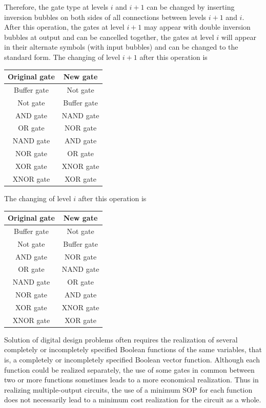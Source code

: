 \documentclass[a4paper,12pt]{report}
\begin{document}
Therefore, the gate type at levels $i$ and $i+1$ can be changed by inserting inversion bubbles on both sides of all connections between levels $i+1$ and $i$. After this operation, the gates at level $i+1$ may appear with double inversion bubbles at output and can be cancelled together, the gates at level $i$ will appear in their alternate symbols (with input bubbles) and can be changed to the standard form. The changing of level $i+1$ after this operation is
\begin{longtable}[c]{|c|c|}
\hline
Original gate & New gate \\\hline\endhead
Buffer gate & Not gate \\\hline
Not gate & Buffer gate \\\hline
AND gate & NAND gate \\\hline
OR gate & NOR gate \\\hline
NAND gate & AND gate \\\hline
NOR gate & OR gate \\\hline
XOR gate & XNOR gate \\\hline
XNOR gate & XOR gate \\\hline
\end{longtable}
The changing of level $i$ after this operation is
\begin{longtable}[c]{|c|c|}
\hline
Original gate & New gate \\\hline\endhead
Buffer gate & Not gate \\\hline
Not gate & Buffer gate \\\hline
AND gate & NOR gate \\\hline
OR gate & NAND gate \\\hline
NAND gate & OR gate \\\hline
NOR gate & AND gate \\\hline
XOR gate & XNOR gate \\\hline
XNOR gate & XOR gate \\\hline
\end{longtable}
Solution of digital design problems often requires the realization of several completely or incompletely specified Boolean functions of the same variables, that is, a completely or incompletely specified Boolean vector function. Although each function could be realized separately, the use of some gates in common between two or more functions sometimes leads to a more economical realization. Thus in realizing multiple-output circuits, the use of a minimum SOP for each function does not necessarily lead to a minimum cost realization for the circuit as a whole.
\end{document}
